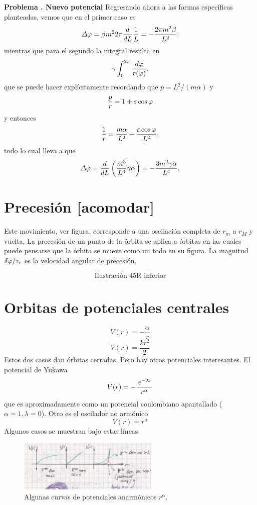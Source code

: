 \documentclass[10pt,oneside]{CBFT_book}
\begin{document}
\begin{ejemplo}{\bf Problema . Nuevo potencial}
Regresando ahora a las formas específicas planteadas, vemos que en el primer caso es
\[
	\Delta \varphi = \beta m^2 2 \pi \frac{d^{\hspace{-0.05em}} {}}{d {L}^{\hspace{-0.05em}}}\frac{1}{L} = - \frac{2\pi m^2 \beta}{L^2},
\]
mientras que para el segundo la integral resulta en
\[
	\gamma \int_0^{2\pi} \frac{d\varphi}{r(\varphi)}, 
\]
que se puede hacer explícitamente recordando que $p = L^2/(m\alpha)$ y
\[
	\frac p r = 1 + \varepsilon \cos \varphi
\]
y entonces 
\[
	\frac 1 r = \frac{m\alpha}{L^2} + \frac{\varepsilon \cos \varphi}{L^2},
\]
todo lo cual lleva a que 
\[
	\Delta \varphi = \frac{d^{\hspace{-0.05em}} {}}{d {L}^{\hspace{-0.05em}}}\left( \frac{m^3}{L^3} \gamma \alpha \right) =
	-\frac{3m^2\gamma \alpha}{L^4}.
\]
\end{ejemplo}

\section{Precesión [acomodar]}

Este movimiento, ver figura, corresponde a una oscilación completa de $r_m$ a $r_M$ y vuelta.
La precesión de un punto de la órbita se aplica a órbitas en las cuales puede pensarse que la órbita se mueve 
como un todo en su figura. La magnitud $\delta \varphi / \tau_r$ es la velocidad angular de precesión.

\[
	\mbox{ Ilustración 45R inferior }
\]

\section{Orbitas de potenciales centrales}

\[
	V(r) = -\frac{\alpha}{r}
\]
\[
	V(r) = \frac{ k r^2 }{2}
\]
Estos dos casos dan órbitas cerradas. Pero hay otros potenciales interesantes.
El potencial de Yukawa
\[
	V(r) = - \frac{\:\mathrm{e}^{-\lambda r}}{r^\alpha}
\]
que es aproximadamente como un potencial coulombiano apantallado ($\alpha=1,\lambda=0$).
Otro es el oscilador no armónico
\[
	V(r) = r^\alpha
\]
Algunos casos se muestran bajo estas líneas

\begin{figure}[hbt]
	\begin{center}
	\includegraphics[width=0.6\textwidth]{images/fig_mc_potenciales_otro.pdf}
	\end{center}
	\caption{Algunas curvas de potenciales anarmónicos $ r^\alpha $.}
\end{figure}
\end{document}
